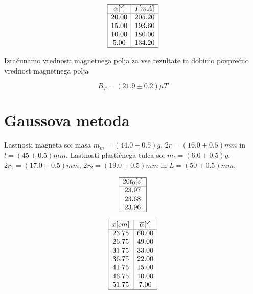 \documentclass[12pt]{report}
\begin{document}
\begin{tabela}[H]
  \centering
  \[
    \begin{array}{|c|c|} \hline
      \alpha [\degree] & I [mA] \\ \hline
      20.00 &  205.20\\
      15.00 &  193.60\\
      10.00 &  180.00\\
       5.00 &  134.20 \\ \hline
   \end{array}
 \]
\end{tabela}

Izračunamo vrednosti magnetnega polja za vse rezultate in dobimo povprečno vrednost magnetnega polja 

\[ B_T = (21.9 \pm 0.2) \mu T\]

\section*{Gaussova metoda}

Lastnosti magneta so: masa $m_m = (44.0 \pm 0.5)g$, $2r = (16.0 \pm 0.5) mm$ in $l = (45 \pm 0.5)mm$. Lastnosti plastičnega tulca so: $m_t = (6.0 \pm 0.5)g$, $2r_1 = (17.0 \pm 0.5)mm$, $2r_2 = (19.0 \pm 0.5)mm$ in $L = (50 \pm 0.5)mm$. 

\begin{tabela}[H]
  \centering
  \[
    \begin{array}{|c|} \hline
      20 t_0 [s] \\ \hline
      23.97 \\ 
      23.68 \\
      23.96 \\ \hline 
    \end{array}
  \]
\end{tabela}




\begin{tabela}[H]
  \centering
  \[
    \begin{array}{|c|c|} \hline
      x [cm] & \overline{\alpha}[\degree] \\ \hline
      23.75 &   60.00\\
      26.75 &   49.00\\
      31.75 &   33.00\\
      36.75 &   22.00\\
      41.75 &   15.00\\
      46.75 &   10.00\\
      51.75 &    7.00 \\ \hline
   \end{array}
  \]
\end{tabela}
\end{document}
